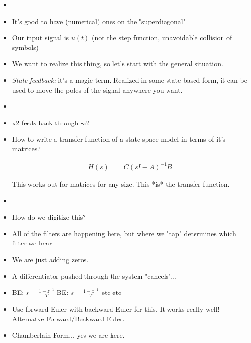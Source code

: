 \begin{itemize}
\item{
}
\item{
        It's good to have (numerical) ones on the "superdiagonal" 
}
\item{
Our input signal is $u(t)$ (not the step function, unavoidable collision of symbols)
}
\item{
We want to realize this thing, so let's start with the general situation. 
}
\item{
    \textit{State feedback:} it's a magic term. Realized in some state-based form, 
    it can be used to move the poles of the signal anywhere you want. 
}
\item{
}
\item{
    x2 feeds back through -a2
}
\item{
    How to write a transfer function of a state space model in terms of it's matrices?

    \begin{align*}
        H(s) &= C(sI - A)^{-1}B
    \end{align*}

    This works out for matrices for any size. This *is* the transfer function. 
}
\item{
}
\item{
    How do we digitize this? 
}
\item{
    All of the filters are happening here, but where we "tap" determines
which filter we hear. 
}
\item{
    We are just adding zeros. 
}
\item{
    A differentiator pushed through the system "cancels"... 
}
\item{
    BE: $s = \frac{1 - z^{-1}}{T} $
    BE: $s = \frac{1 - z^{-1}}{T} $
    etc etc 
}
\item{
    Use forward Euler with backward Euler for this. It works really well!
    Alternatve Forward/Backward Euler.
}
\item{
    Chamberlain Form... yes we are here.
}
\end{itemize}
